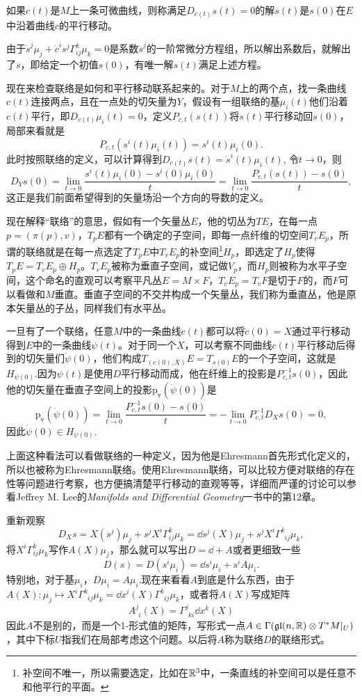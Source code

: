 \para 如果$c(t)$是$M$上一条可微曲线，则称满足$D_{\dot{c}(t)}s(t)=0$的解$s(t)$是$s(0)$在$E$中沿着曲线$c$的平行移动。

由于$\dot{s}^j\mu_j+\dot{c}^i s^j\Gamma^{k}_{ij}\mu_k=0$是系数$\dot{s}^j$的一阶常微分方程组，所以解出系数后，就解出了$s$，即给定一个初值$s(0)$，有唯一解$s(t)$满足上述方程。

现在来检查联络是如何和平行移动联系起来的。对于$M$上的两个点，找一条曲线$c(t)$连接两点，且在一点处的切矢量为$Y$，假设有一组联络的基$\mu_i(t)$他们沿着$c(t)$平行，即$D_{\dot{c}(t)}\mu_i(t)=0$，定义$P_{c,t}(s(t))$将$s(t)$平行移动回$s(0)$，局部来看就是
\[
	P_{c,t}(s^i(t)\mu_i(t))=s^i(t)\mu_i(0).
\]
此时按照联络的定义，可以计算得到$D_{\dot{c}(t)}s(t)=\dot{s}^i(t)\mu_i(t)$,
令$t\to 0$，则
\[
	D_{Y}s(0)=\lim_{t\to 0}\frac{s^i(t)\mu_i(0)-s^i(0)\mu_i(0)}{t}=\lim_{t\to 0}\frac{P_{c,t}(s(t))-s(0)}{t},
\]
这正是我们前面希望得到的矢量场沿一个方向的导数的定义。

现在解释“联络”的意思，假如有一个矢量丛$E$，他的切丛为$TE$，在每一点$p=(\pi(p),v)$，$T_pE$都有一个确定的子空间，即每一点纤维的切空间$T_vE_p$，所谓的联络就是在每一点选定了$T_pE$中$T_vE_p$的补空间\footnote{补空间不唯一，所以需要选定，比如在$\mathbb{R}^3$中，一条直线的补空间可以是任意不和他平行的平面。}$H_p$，即选定了$H_p$使得$T_pE=T_vE_p\oplus H_p$。$T_vE_p$被称为垂直子空间，或记做$V_p$，而$H_p$则被称为水平子空间，这个命名的直观可以考察平凡丛$E=M\times F$，$T_vE_p=T_v F$是切于$F$的，而$F$可以看做和$M$垂直。垂直子空间的不交并构成一个矢量丛，我们称为垂直丛，他是原本矢量丛的子丛，同样我们有水平丛。

一旦有了一个联络，任意$M$中的一条曲线$c(t)$都可以将$\dot{c}(0)=X$通过平行移动得到$E$中的一条曲线$\psi(t)$。对于同一个$X$，可以考察不同曲线$c(t)$平行移动后得到的切矢量们$\dot{\psi}(0)$，他们构成$T_{(c(0),X)}E=T_{s(0)}E$的一个子空间，这就是$H_{\psi(0)}$.因为$\psi(t)$是使用$D$平行移动而成，他在纤维上的投影是$P_{c,t}^{-1}s(0)$，因此他的切矢量在垂直子空间上的投影$\mathrm{p_v}(\dot{\psi}(0))$是
\[
	\mathrm{p_v}(\dot{\psi}(0))=\lim_{t\to 0}\frac{P_{c,t}^{-1}s(0)-s(0)}{t}
	=-\lim_{t\to 0}P_{c,t}^{-1}D_{X}s(0)=0,
\]
因此$\dot{\psi}(0)\in H_{\psi(0)}$.

上面这种看法可以看做联络的一种定义，因为他是Ehresmann首先形式化定义的，所以也被称为Ehresmann联络。使用Ehresmann联络，可以比较方便对联络的存在性等问题进行考察，也方便搞清楚平行移动的直观等等，详细而严谨的讨论可以参看Jeffrey M. Lee的\emph{Manifolds and Differential Geometry}一书中的第12章。

重新观察
\[
	D_Xs=X(s^j)\mu_j+s^jX^i\Gamma^{k}_{ij}\mu_k=\dd s^j(X)\mu_j+s^jX^i\Gamma^k_{\phantom{k}ij}\mu_k,
\]
将$X^i\Gamma^{k}_{ij}\mu_k$写作$A(X)\mu_j$，那么就可以写出$D=\dd +A$或者更细致一些
\[
	D(s)=D(s^i\mu_i)=\dd s^i \mu_i+s^i A\mu_i.
\]
特别地，对于基$\mu_i$，$D\mu_i=A\mu_i$.现在来看看$A$到底是什么东西，由于$A(X):\mu_j \mapsto X^i\Gamma^k_{\phantom{k}ij}\mu_k=\dd x^i(X)\Gamma^k_{\phantom{k}ij}\mu_k$，或者将$A(X)$写成矩阵
\[
	A_{\phantom{j}i}^{j}(X)=\Gamma^j_{\phantom{j}ki}\dd x^k(X)
\]
因此$A$不是别的，而是一个1-形式值的矩阵，写形式一点$A\in \Gamma(\mathfrak{gl}(n,\mathbb{R})\otimes T^*M|_U)$，其中下标$U$指我们在局部考虑这个问题。以后将$A$称为联络$D$的联络形式。

